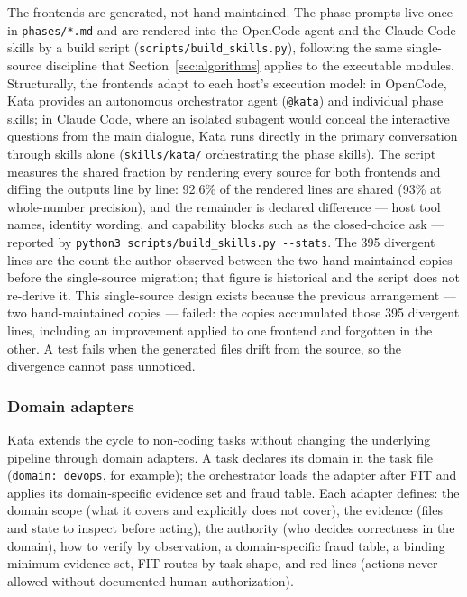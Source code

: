 \documentclass[11pt]{article}
\begin{document}
The frontends are generated, not hand-maintained. The phase prompts live
once in \texttt{phases/*.md} and are rendered into the OpenCode agent and
the Claude Code skills by a build script (\texttt{scripts/build\_skills.py}),
following the same single-source discipline that Section~\ref{sec:algorithms}
applies to the executable modules. Structurally, the frontends adapt to each
host's execution model: in OpenCode, Kata provides an autonomous orchestrator
agent (\texttt{@kata}) and individual phase skills; in Claude Code, where an
isolated subagent would conceal the interactive questions from the main
dialogue, Kata runs directly in the primary conversation through skills
alone (\texttt{skills/kata/} orchestrating the phase skills).
The script measures the shared
fraction by rendering every source for both frontends and diffing the
outputs line by line: 92.6\% of the rendered lines are shared (93\% at
whole-number precision), and the remainder is declared difference --- host
tool names, identity wording, and capability blocks such as the
closed-choice ask --- reported by
\texttt{python3 scripts/build\_skills.py -{}-stats}. The 395 divergent
lines are the count the author observed between the two hand-maintained
copies before the single-source migration; that figure is historical and
the script does not re-derive it. This
single-source design exists because the previous arrangement --- two
hand-maintained copies --- failed: the copies accumulated those 395
divergent lines, including an improvement applied to one frontend and
forgotten in the other. A test fails when the generated files drift from
the source, so the divergence cannot pass unnoticed.

\subsubsection{Domain adapters}

Kata extends the cycle to non-coding tasks without changing the underlying
pipeline through domain adapters. A task declares its domain in the task
file (\texttt{domain: devops}, for example); the orchestrator loads the
adapter after FIT and applies its domain-specific evidence set and fraud
table. Each adapter defines: the domain scope (what it covers and
explicitly does not cover), the evidence (files and state to inspect before
acting), the authority (who decides correctness in the domain), how to
verify by observation, a domain-specific fraud table, a binding minimum
evidence set, FIT routes by task shape, and red lines (actions never
allowed without documented human authorization).
\end{document}
